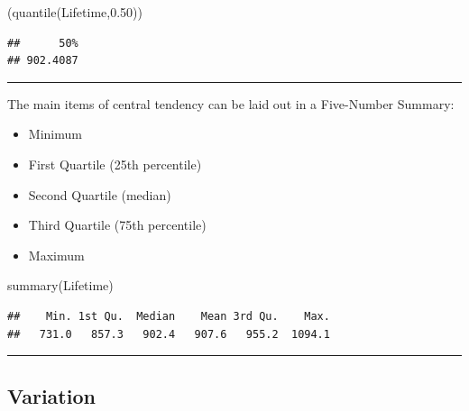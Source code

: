 \documentclass[
]{book}
\newenvironment{Shaded}{\begin{snugshade}}{\end{snugshade}}
\newcommand{\FloatTok}[1]{\textcolor[rgb]{0.00,0.00,0.81}{#1}}
\newcommand{\FunctionTok}[1]{\textcolor[rgb]{0.00,0.00,0.00}{#1}}
\newcommand{\NormalTok}[1]{#1}
\providecommand{\tightlist}{%
  \setlength{\itemsep}{0pt}\setlength{\parskip}{0pt}}
\begin{document}
\begin{Shaded}
\begin{Highlighting}[]
\NormalTok{(}\FunctionTok{quantile}\NormalTok{(Lifetime,}\FloatTok{0.50}\NormalTok{))}
\end{Highlighting}
\end{Shaded}

\begin{verbatim}
##      50% 
## 902.4087
\end{verbatim}

\begin{center}\rule{0.5\linewidth}{0.5pt}\end{center}

The main items of central tendency can be laid out in a Five-Number Summary:

\begin{itemize}
\tightlist
\item
  Minimum
\item
  First Quartile (25th percentile)
\item
  Second Quartile (median)
\item
  Third Quartile (75th percentile)
\item
  Maximum
\end{itemize}

\begin{Shaded}
\begin{Highlighting}[]
\FunctionTok{summary}\NormalTok{(Lifetime)}
\end{Highlighting}
\end{Shaded}

\begin{verbatim}
##    Min. 1st Qu.  Median    Mean 3rd Qu.    Max. 
##   731.0   857.3   902.4   907.6   955.2  1094.1
\end{verbatim}

\begin{center}\rule{0.5\linewidth}{0.5pt}\end{center}

\hypertarget{variation}{%
\subsection{Variation}\label{variation}}
\end{document}
